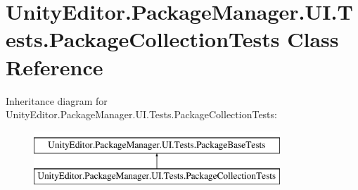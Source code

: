 \hypertarget{class_unity_editor_1_1_package_manager_1_1_u_i_1_1_tests_1_1_package_collection_tests}{}\section{Unity\+Editor.\+Package\+Manager.\+U\+I.\+Tests.\+Package\+Collection\+Tests Class Reference}
\label{class_unity_editor_1_1_package_manager_1_1_u_i_1_1_tests_1_1_package_collection_tests}
Inheritance diagram for Unity\+Editor.\+Package\+Manager.\+U\+I.\+Tests.\+Package\+Collection\+Tests\+:\begin{figure}[H]
\begin{center}
\leavevmode
\includegraphics[height=2.000000cm]{class_unity_editor_1_1_package_manager_1_1_u_i_1_1_tests_1_1_package_collection_tests}
\end{center}
\end{figure}
